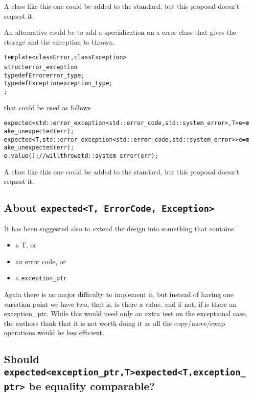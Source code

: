 \documentclass[a4paper,10pt]{article}
\newcommand{\cpp}[1]{\lstinline{#1}}
\newcommand{\suppress}[1]{\colorbox{suppress_color}{#1}}
\newcommand{\update}[1]{\colorbox{update_color}{#1}}
\begin{document}
\noindent
A class like this one could be added to the standard, but this proposal doesn't request it. 

An alternative could be to add a specialization on a error class that gives the storage and the exception to thrown.

\begin{alltt}
template <class Error, class Exception>
  struct error_exception {
    typedef Error error_type;
    typedef Exception exception_type;
  };
\end{alltt}

\noindent
that could be used as follows

\begin{alltt}
\suppress{expected<std::error_exception<std::error_code, std::system_error>, T> e = make_unexpected(err);}
\update{expected<T, std::error_exception<std::error_code, std::system_error>> e = make_unexpected(err);}
e.value(); // will throw std::system_error(err);
\end{alltt}

A class like this one could be added to the standard, but this proposal doesn't request it. 

\subsection{About \cpp{expected<T, ErrorCode, Exception>}}

It has been suggested also to extend the design into something that contains 

\begin{itemize}
\item a T, or
\item an error code, or
\item a \cpp{exception_ptr} 
\end{itemize}

Again there is no major difficulty to implement it, but instead of having one variation point we have two, that is, is there a value, and if not, if is there an exception_ptr. While this would need only an extra test on the exceptional case, the authors think that it is not worth doing it as all the copy/move/swap operations would be less efficient. 

\subsection{Should \suppress{\cpp{expected<exception_ptr,T>}}\update{\cpp{expected<T,exception_ptr>}} be equality comparable?}
\end{document}
